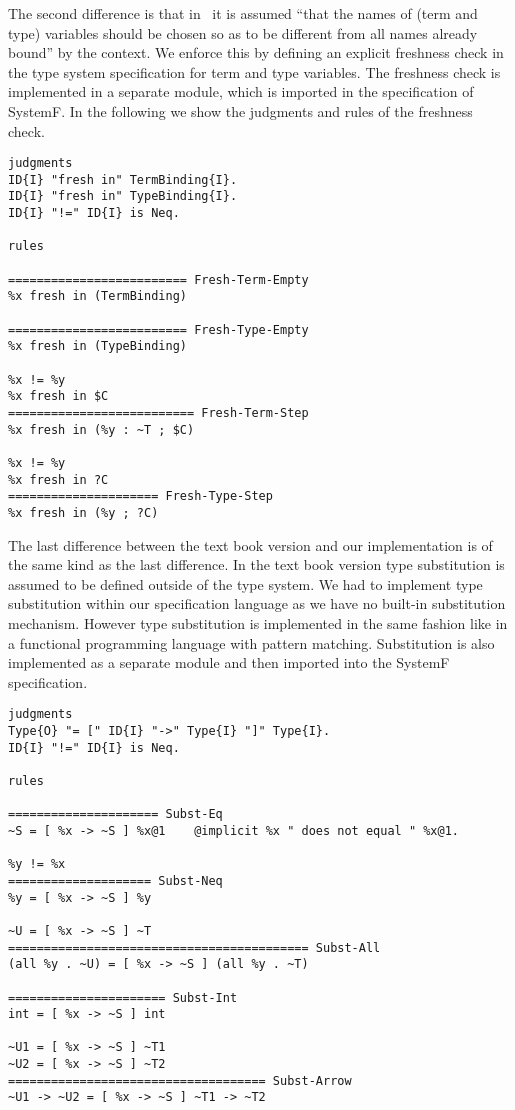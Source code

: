 The second difference is that in~\cite{Pierce:2002:TPL:509043} it is
assumed ``that the names of (term and type) variables should be chosen
so as to be different from all names already bound'' by the
context. We enforce this by defining an explicit freshness check in
the type system specification for term and type variables. The
freshness check is implemented in a separate module, which is imported
in the specification of SystemF. In the following we show the
judgments and rules of the freshness check.
\newpage
\begin{lstlisting}[language=sltc]
judgments 
ID{I} "fresh in" TermBinding{I}.
ID{I} "fresh in" TypeBinding{I}.
ID{I} "!=" ID{I} is Neq.

rules

========================= Fresh-Term-Empty
%x fresh in (TermBinding)

========================= Fresh-Type-Empty
%x fresh in (TypeBinding)

%x != %y
%x fresh in $C
========================== Fresh-Term-Step
%x fresh in (%y : ~T ; $C)

%x != %y
%x fresh in ?C
===================== Fresh-Type-Step
%x fresh in (%y ; ?C)
\end{lstlisting}

The last difference between the text book version and our
implementation is of the same kind as the last difference. In the text
book version type substitution is assumed to be defined outside of the
type system. We had to implement type substitution within our
specification language as we have no built-in substitution
mechanism. However type substitution is implemented in the same
fashion like in a functional programming language with pattern
matching. Substitution is also implemented as a separate module and
then imported into the SystemF specification.

\begin{lstlisting}[language=sltc]
judgments
Type{O} "= [" ID{I} "->" Type{I} "]" Type{I}.
ID{I} "!=" ID{I} is Neq.

rules

===================== Subst-Eq
~S = [ %x -> ~S ] %x@1    @implicit %x " does not equal " %x@1.

%y != %x
==================== Subst-Neq
%y = [ %x -> ~S ] %y

~U = [ %x -> ~S ] ~T
========================================== Subst-All
(all %y . ~U) = [ %x -> ~S ] (all %y . ~T)

====================== Subst-Int
int = [ %x -> ~S ] int

~U1 = [ %x -> ~S ] ~T1
~U2 = [ %x -> ~S ] ~T2
==================================== Subst-Arrow
~U1 -> ~U2 = [ %x -> ~S ] ~T1 -> ~T2
\end{lstlisting}

